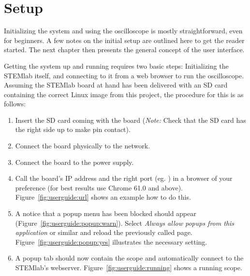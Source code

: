 %
%

%
%
\chapter{Setup} %
\label{ch:userguide:setup}

Initializing the system and using  the oscilloscope is mostly straightforward,
even for beginners. A few notes on the  initial setup are outlined here to get
the reader started. The next chapter then  presents the general concept of the
user interface.

Getting the system  up and running requires two  basic steps: Initializing the
STEMlab  itself,  and  connecting  to  it  from  a  web  browser  to  run  the
oscilloscope.  Assuming the  STEMlab board at hand has been  delivered with an
SD card  containing the correct Linux  image from this project,  the procedure
for this is as follows:
\begin{enumerate}
    \item
        Insert the SD card coming  with the board (\emph{Note:} Check that the
        SD card has the right side up to make pin contact).
    \item
        Connect the board physically to the network.
    \item
        Connect the board to the power supply.
    \item
        Call    the    board's    IP    address    and    the    right    port
        (eg.    )    in    a    browser    of
        your   preference   (for   best    results   use   Chrome   61.0   and
        above). Figure~\ref{fig:userguide:url} shows  an example  how to
        do this.
    \item  
        A  notice   that  a  popup   menu  has  been  blocked   should  appear
        (Figure~\ref{fig:userguide:popup:warn}). Select   \emph{Always   allow
        popups from  this application}  or similar  and reload  the previously
        called   page. Figure~\ref{fig:userguide:popup:yes}  illustrates   the
        necessary setting.
    \item
        A popup tab should now contain  the scope and automatically connect to
        the  STEMlab's  webserver. Figure~\ref{fig:userguide:running} shows  a
        running scope.
\end{enumerate}

